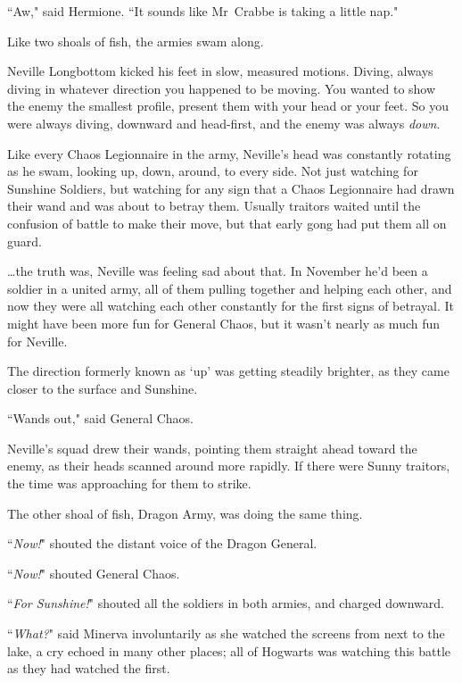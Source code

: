 ``Aw," said Hermione. ``It sounds like Mr~Crabbe is taking a little nap."

\later

Like two shoals of fish, the armies swam along.

Neville Longbottom kicked his feet in slow, measured motions. Diving, always diving in whatever direction you happened to be moving. You wanted to show the enemy the smallest profile, present them with your head or your feet. So you were always diving, downward and head-first, and the enemy was always \emph{down}.

Like every Chaos Legionnaire in the army, Neville's head was constantly rotating as he swam, looking up, down, around, to every side. Not just watching for Sunshine Soldiers, but watching for any sign that a Chaos Legionnaire had drawn their wand and was about to betray them. Usually traitors waited until the confusion of battle to make their move, but that early gong had put them all on guard.

{\ldots}the truth was, Neville was feeling sad about that. In November he'd been a soldier in a united army, all of them pulling together and helping each other, and now they were all watching each other constantly for the first signs of betrayal. It might have been more fun for General Chaos, but it wasn't nearly as much fun for Neville.

The direction formerly known as `up' was getting steadily brighter, as they came closer to the surface and Sunshine.

``Wands out," said General Chaos.

Neville's squad drew their wands, pointing them straight ahead toward the enemy, as their heads scanned around more rapidly. If there were Sunny traitors, the time was approaching for them to strike.

The other shoal of fish, Dragon Army, was doing the same thing.

``\emph{Now!}" shouted the distant voice of the Dragon General.

``\emph{Now!}" shouted General Chaos.

``\emph{For Sunshine!}" shouted all the soldiers in both armies, and charged downward.

\later

``\emph{What?}" said Minerva involuntarily as she watched the screens from next to the lake, a cry echoed in many other places; all of Hogwarts was watching this battle as they had watched the first.

